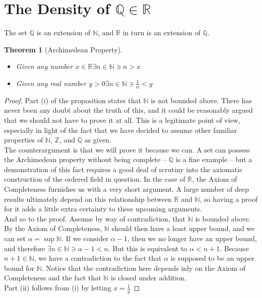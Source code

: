 \documentclass[10pt]{report}
\newtheorem{thm2}{Theorem}[section]
\begin{document}
\section{The Density of $\mathbb{Q}\in\mathbb{R}$}
The set $\mathbb{Q}$ is an extension of $\mathbb{N}$, and $\mathbb{R}$ in turn is an extension of $\mathbb{Q}$.
\begin{thm2}[Archimedean Property]
\begin{itemize}
\item[(i)] Given any number $x\in\mathbb{R}\exists n\in\mathbb{N}\ni n>x$
\item[(ii)] Given any real number $y>0\exists n\in\mathbb{N}\ni \frac{1}{n}<y$
\end{itemize}
\end{thm2}
\begin{proof}
Part (i) of the proposition states that $\mathbb{N}$ is not bounded above. There has never been any doubt about the truth of this, and it could be reasonably argued that we should not have to prove it at all. This is a legitimate point of view, especially in light of the fact that we have decided to assume other familiar properties of $\mathbb{N}$, $\mathbb{Z}$, and $\mathbb{Q}$ as given.\\
The counterargument is that we will prove it because we can. A set can possess the Archimedean property without being complete -- $\mathbb{Q}$ is a fine example -- but a demonstration of this fact requires a good deal of scrutiny into the axiomatic construction of the ordered field in question. In the case of $\mathbb{R}$, the Axiom of Completeness furnishes us with a very short argument. A large number of deep results ultimately depend on this relationship between $\mathbb{R}$ and $\mathbb{N}$, so having a proof for it adds a little extra certainty to these upcoming arguments.\\
And so to the proof. Assume by way of contradiction, that $\mathbb{N}$ is bounded above. By the Axiom of Completeness, $\mathbb{N}$ should then have a least upper bound, and we can set $\alpha = \sup\mathbb{N}$. If we consider $\alpha - 1$, then we no longer have an upper bound, and therefore $\exists n\in\mathbb{N}\ni \alpha - 1 < n$. But this is equivalent to $\alpha < n+1$. Because $n+1\in\mathbb{N}$, we have a contradiction to the fact that $\alpha$ is supposed to be an upper bound for $\mathbb{N}$. Notice that the contradiction here depends inly on the Axiom of Completeness and the fact that $\mathbb{N}$ is closed under addition.\\
Part (ii) follows from (i) by letting $x = \frac{1}{y}$
\end{proof}
\end{document}
